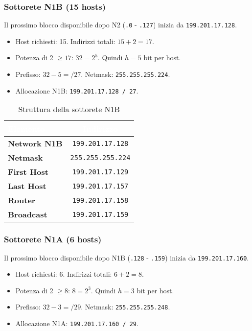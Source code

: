 \subsubsection{Sottorete N1B (15 hosts)}
Il prossimo blocco disponibile dopo N2 (\texttt{.0} - \texttt{.127}) inizia da \texttt{199.201.17.128}.
\begin{itemize}
    \item Host richiesti: 15. Indirizzi totali: $15 + 2 = 17$.
    \item Potenza di 2 $\geq 17$: $32 = 2^5$. Quindi $h=5$ bit per host.
    \item Prefisso: $32 - 5 = /27$. Netmask: \texttt{255.255.255.224}.
    \item Allocazione N1B: \texttt{199.201.17.128 / 27}.
\end{itemize}

\begin{table}[h]
\centering
\begin{tabular}{|l|c|}
\hline
\rowcolor{bg_custom}
\textcolor{white}{\textbf{Elemento}} & \textcolor{white}{\textbf{Indirizzo}} \\
\hline
\textbf{Network N1B} & \texttt{199.201.17.128} \\
\hline
\textbf{Netmask} & \texttt{255.255.255.224} \\
\hline
\textbf{First Host} & \texttt{199.201.17.129} \\
\hline
\textbf{Last Host} & \texttt{199.201.17.157} \\
\hline
\textbf{Router} & \texttt{199.201.17.158} \\
\hline
\textbf{Broadcast} & \texttt{199.201.17.159} \\
\hline
\end{tabular}
\caption{Struttura della sottorete N1B}
\end{table}

\subsubsection{Sottorete N1A (6 hosts)}
Il prossimo blocco disponibile dopo N1B (\texttt{.128} - \texttt{.159}) inizia da \texttt{199.201.17.160}.
\begin{itemize}
    \item Host richiesti: 6. Indirizzi totali: $6 + 2 = 8$.
    \item Potenza di 2 $\geq 8$: $8 = 2^3$. Quindi $h=3$ bit per host.
    \item Prefisso: $32 - 3 = /29$. Netmask: \texttt{255.255.255.248}.
    \item Allocazione N1A: \texttt{199.201.17.160 / 29}.
\end{itemize}

